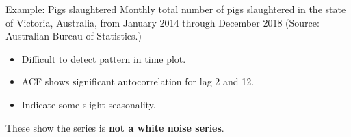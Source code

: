 \documentclass[
  14pt,
  ignorenonframetext,
  aspectratio=169,
]{beamer}
\providecommand{\tightlist}{%
  \setlength{\itemsep}{0pt}\setlength{\parskip}{0pt}}
\begin{document}
\begin{frame}{Example: Pigs slaughtered}
\protect{}\label{example-pigs-slaughtered-2}
Monthly total number of pigs slaughtered in the state of Victoria,
Australia, from January 2014 through December 2018 (Source: Australian
Bureau of Statistics.)\pause

\begin{itemize}
\tightlist
\item
  Difficult to detect pattern in time plot.
\item
  ACF shows significant autocorrelation for lag 2 and 12.
\item
  Indicate some slight seasonality.
\end{itemize}

\pause

These show the series is \textbf{not a white noise series}.
\end{frame}
\end{document}
